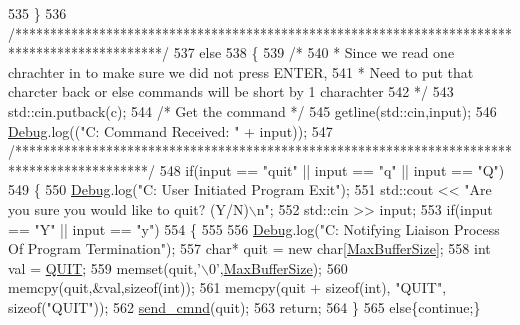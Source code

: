 \begin{DoxyCode}
535     \}
536     \textcolor{comment}{/*********************************************************************************************/}
537     \textcolor{keywordflow}{else}
538     \{
539       \textcolor{comment}{/*}
540 \textcolor{comment}{       * Since we read one chrachter in to make sure we did not press ENTER,}
541 \textcolor{comment}{       * Need to put that charcter back or else commands will be short by 1 charachter}
542 \textcolor{comment}{       */}
543       std::cin.putback(c);
544       \textcolor{comment}{/* Get the command */}
545       getline(std::cin,input);
546       \mbox{\hyperlink{_cli_8h_ab6d95a4e6a59b4ad033ed3af31d878e0}{Debug}}.log((\textcolor{stringliteral}{"C: Command Received: "} + input));
547       \textcolor{comment}{/*******************************************************************************************/}
548       \textcolor{keywordflow}{if}(input == \textcolor{stringliteral}{"quit"} || input == \textcolor{stringliteral}{"q"} || input == \textcolor{stringliteral}{"Q"})
549       \{
550         \mbox{\hyperlink{_cli_8h_ab6d95a4e6a59b4ad033ed3af31d878e0}{Debug}}.log(\textcolor{stringliteral}{"C: User Initiated Program Exit"});
551         std::cout << \textcolor{stringliteral}{"Are you sure you would like to quit? (Y/N)\(\backslash\)n"};
552         std::cin >> input;
553         \textcolor{keywordflow}{if}(input == \textcolor{stringliteral}{"Y"} || input == \textcolor{stringliteral}{"y"})
554         \{
555 
556           \mbox{\hyperlink{_cli_8h_ab6d95a4e6a59b4ad033ed3af31d878e0}{Debug}}.log(\textcolor{stringliteral}{"C: Notifying Liaison Process Of Program Termination"});
557           \textcolor{keywordtype}{char}* quit = \textcolor{keyword}{new} \textcolor{keywordtype}{char}[\mbox{\hyperlink{_cli_8h_a97a33a33e5428e13cfa0eff5ba0e846f}{MaxBufferSize}}];
558           \textcolor{keywordtype}{int} val = \mbox{\hyperlink{_command_codes_8h_a3c18e64ca07cf21278f4189cd4c2732f}{QUIT}};
559           memset(quit,\textcolor{charliteral}{'\(\backslash\)0'},\mbox{\hyperlink{_cli_8h_a97a33a33e5428e13cfa0eff5ba0e846f}{MaxBufferSize}});
560           memcpy(quit,&val,\textcolor{keyword}{sizeof}(\textcolor{keywordtype}{int}));
561           memcpy(quit + \textcolor{keyword}{sizeof}(\textcolor{keywordtype}{int}), \textcolor{stringliteral}{"QUIT"}, \textcolor{keyword}{sizeof}(\textcolor{stringliteral}{"QUIT"}));
562           \mbox{\hyperlink{class_c_l_i_a1d25fcb18cf42e03a7e38c24a8ba1506}{send\_cmnd}}(quit);
563           \textcolor{keywordflow}{return};
564         \}
565         \textcolor{keywordflow}{else}\{\textcolor{keywordflow}{continue};\}

\end{DoxyCode}
